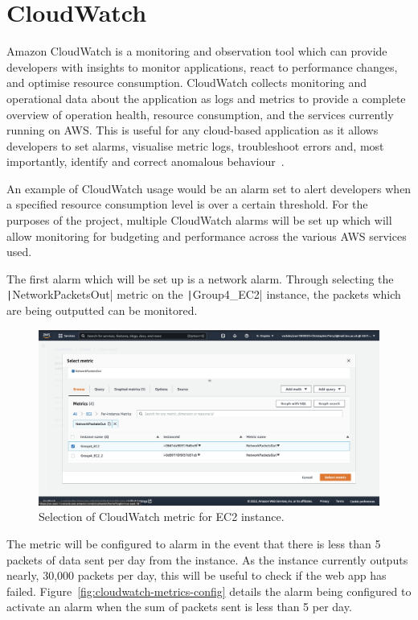 \chapter{CloudWatch}\label{ch:cloudwatch}

Amazon CloudWatch is a monitoring and observation tool which can provide developers with insights to monitor
applications, react to performance changes, and optimise resource consumption.
CloudWatch collects monitoring and operational data about the application as logs and metrics to provide a
complete overview of operation health, resource consumption, and the services currently running on AWS\@.
This is useful for any cloud-based application as it allows developers to set alarms, visualise metric logs,
troubleshoot errors and, most importantly, identify and correct anomalous behaviour~\parencite{amazon2022amazon}.

An example of CloudWatch usage would be an alarm set to alert developers when a specified resource consumption level
is over a certain threshold.
For the purposes of the project, multiple CloudWatch alarms will be set up which will allow monitoring for budgeting
and performance across the various AWS services used.

The first alarm which will be set up is a network alarm.
Through selecting the \texttt|NetworkPacketsOut| metric on the \texttt|Group4_EC2| instance,
the packets which are being outputted can be monitored.

\begin{figure}[!htbp]
    \centering
    \includegraphics[width=\textwidth]{resources/cloudwatch/cloudwatch-metric-selection}
    \caption{Selection of CloudWatch metric for EC2 instance.}
    \label{fig:cloudwatch-metrics}
\end{figure}

\clearpage
The metric will be configured to alarm in the event that there is less than 5 packets of data sent per day from the
instance.
As the instance currently outputs nearly, 30,000 packets per day, this will be useful to check if the web app has
failed.
Figure~\ref{fig:cloudwatch-metrics-config} details the alarm being configured to activate an alarm when the sum of
packets sent is less than 5 per day.

